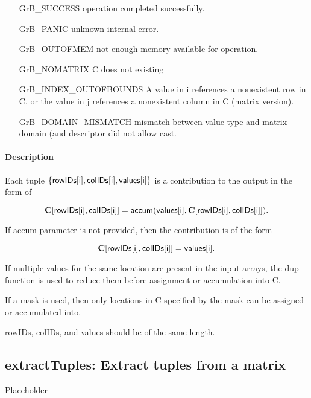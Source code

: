 \begin{itemize}[leftmargin=2.1in]
\item[{\sf GrB\_SUCCESS}] 	operation completed successfully.
\item[{\sf GrB\_PANIC}]	    unknown internal error.
\item[{\sf GrB\_OUTOFMEM}]	not enough memory available for operation.
\item[{\sf GrB\_NOMATRIX}]  C does not existing
\item[{\sf GrB\_INDEX\_OUTOFBOUNDS}]
        A value in i references a nonexistent row in C, or
	    the value in j references a nonexistent column in C (matrix version).
\item[\sf GrB\_DOMAIN\_MISMATCH]  
	   mismatch between value type and matrix domain (and descriptor did not allow cast.
\end{itemize}


\paragraph{Description}
Each tuple $\{ {\sf rowIDs[i]}, {\sf colIDs[i]}, {\sf values[i]}\}$ is a contribution to the output in the form of 

$${\bf C}[{\sf rowIDs[i]},{\sf colIDs[i]}] = {\sf accum}({\sf values[i]}, {\bf C}[{\sf rowIDs[i]}, {\sf colIDs[i]}]).$$

If {\sf accum} parameter is not provided, then the contribution is of the form 

$${\bf C}[{\sf rowIDs[i]}, {\sf colIDs[i]}] = {\sf values[i]}.$$

If multiple values for the same location are present in the input arrays, the 
dup function is used to reduce them before assignment or accumulation into {\sf C}.

If a mask is used, then only locations in {\sf C} specified by the mask can be assigned or
accumulated into.
 
{\sf rowIDs}, {\sf colIDs}, and {\sf values} should be of the same length. 


\subsection{{\sf extractTuples}: Extract tuples from a matrix}
\label{Sec:extractTuples}

Placeholder

